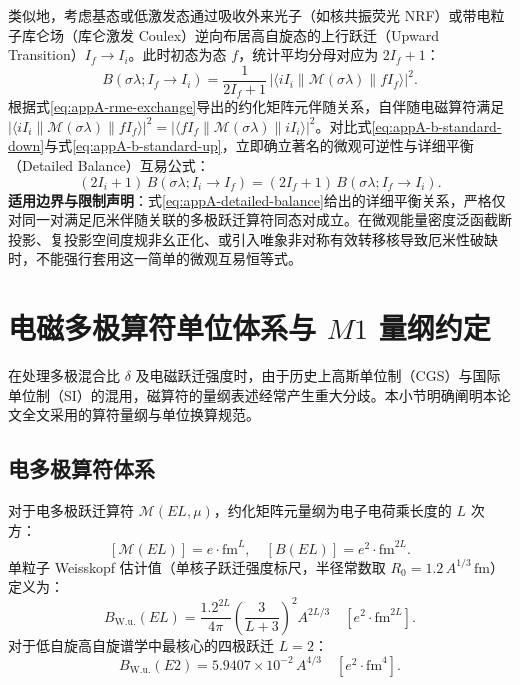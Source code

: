 类似地，考虑基态或低激发态通过吸收外来光子（如核共振荧光 NRF）或带电粒子库仑场（库仑激发 Coulex）逆向布居高自旋态的上行跃迁（Upward Transition）$I_f \to I_i$。此时初态为态 $f$，统计平均分母对应为 $2I_f + 1$：
\begin{equation}\label{eq:appA-b-standard-up}
B(\sigma\lambda; I_f \to I_i) = \frac{1}{2I_f + 1} \, |\langle i I_i \| \mathcal{M}(\sigma\lambda) \| f I_f \rangle|^2 .
\end{equation}
根据式\eqref{eq:appA-rme-exchange}导出的约化矩阵元伴随关系，自伴随电磁算符满足 $|\langle i I_i \| \mathcal{M}(\sigma\lambda) \| f I_f \rangle|^2 = |\langle f I_f \| \mathcal{M}(\sigma\lambda) \| i I_i \rangle|^2$。对比式\eqref{eq:appA-b-standard-down}与式\eqref{eq:appA-b-standard-up}，立即确立著名的微观可逆性与详细平衡（Detailed Balance）互易公式：
\begin{equation}\label{eq:appA-detailed-balance}
(2I_i + 1) \, B(\sigma\lambda; I_i \to I_f) = (2I_f + 1) \, B(\sigma\lambda; I_f \to I_i) .
\end{equation}
\textbf{适用边界与限制声明}：式\eqref{eq:appA-detailed-balance}给出的详细平衡关系，严格仅对同一对满足厄米伴随关联的多极跃迁算符同态对成立。在微观能量密度泛函截断投影、复投影空间度规非幺正化、或引入唯象非对称有效转移核导致厄米性破缺时，不能强行套用这一简单的微观互易恒等式。

\section{电磁多极算符单位体系与 $M1$ 量纲约定}\label{sec:appA-6}

在处理多极混合比 $\delta$ 及电磁跃迁强度时，由于历史上高斯单位制（CGS）与国际单位制（SI）的混用，磁算符的量纲表述经常产生重大分歧。本小节明确阐明本论文全文采用的算符量纲与单位换算规范。

\subsection{电多极算符体系}
对于电多极跃迁算符 $\mathcal{M}(EL, \mu)$，约化矩阵元量纲为电子电荷乘长度的 $L$ 次方：
\begin{equation}\label{eq:appA-el-units}
[\mathcal{M}(EL)] = e \cdot \mathrm{fm}^L , \quad [B(EL)] = e^2 \cdot \mathrm{fm}^{2L} .
\end{equation}
单粒子 Weisskopf 估计值（单核子跃迁强度标尺，半径常数取 $R_0 = 1.2\,A^{1/3}\,\mathrm{fm}$）定义为：
\begin{equation}\label{eq:appA-weisskopf-el}
B_{\mathrm{W.u.}}(EL) = \frac{1.2^{2L}}{4\pi} \left( \frac{3}{L+3} \right)^2 A^{2L/3} \quad [e^2 \cdot \mathrm{fm}^{2L}] .
\end{equation}
对于低自旋高自旋谱学中最核心的四极跃迁 $L=2$：
\begin{equation}\label{eq:appA-be2-wu}
B_{\mathrm{W.u.}}(E2) = 5.9407 \times 10^{-2} \, A^{4/3} \quad [e^2 \cdot \mathrm{fm}^4] .
\end{equation}


